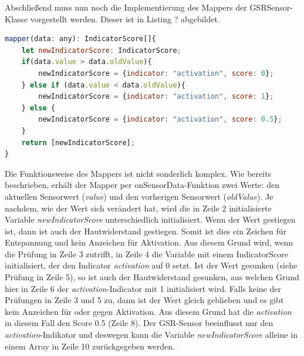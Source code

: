 Abschließend muss nun noch die Implementierung des Mappers der GSRSensor-Klasse vorgestellt werden. Dieser ist in Listing ? abgebildet. \newline
\begin{lstlisting}[caption={Mapper des GSR-Sensors}, language=JavaScript]
mapper(data: any): IndicatorScore[]{
	let newIndicatorScore: IndicatorScore;
	if(data.value > data.oldValue){
		newIndicatorScore = {indicator: "activation", score: 0};
	} else if (data.value < data.oldValue){
		newIndicatorScore = {indicator: "activation", score: 1};
	} else { 
		newIndicatorScore = {indicator: "activation", score: 0.5};
	}
	return [newIndicatorScore];
}
\end{lstlisting}
Die Funktionsweise des Mappers ist nicht sonderlich komplex. Wie bereits beschrieben, erhält der Mapper per onSensorData-Funktion zwei Werte: den aktuellen Sensorwert (\textit{value}) und den vorherigen Sensorwert (\textit{oldValue}). Je nachdem, wie der Wert sich verändert hat, wird die in Zeile 2 initialisierte Variable \textit{newIndicatorScore} unterschiedlich initialisiert. Wenn der Wert gestiegen ist, dann ist auch der Hautwiderstand gestiegen. Somit ist dies ein Zeichen für Entspannung und kein Anzeichen für Aktivation. Aus diesem Grund wird, wenn die Prüfung in Zeile 3 zutrifft, in Zeile 4 die Variable mit einem IndicatorScore initialisiert, der den Indicator \textit{activation} auf 0 setzt. Ist der Wert gesunken (siehe Prüfung in Zeile 5), so ist auch der Hautwiderstand gesunken, aus welchen Grund hier in Zeile 6 der \textit{activation}-Indicator mit 1 initialisiert wird.  Falls keine der Prüfungen in Zeile 3 und 5 zu, dann ist der Wert gleich geblieben und es gibt kein Anzeichen für oder gegen Aktivation. Aus diesem Grund hat die \textit{activation} in diesem Fall den Score 0.5 (Zeile 8). Der GSR-Sensor beeinflusst nur den \textit{activation}-Indikator und deswegen kann die Variable \textit{newIndicatorScore} alleine in einem Array in Zeile 10 zurückgegeben werden. 
